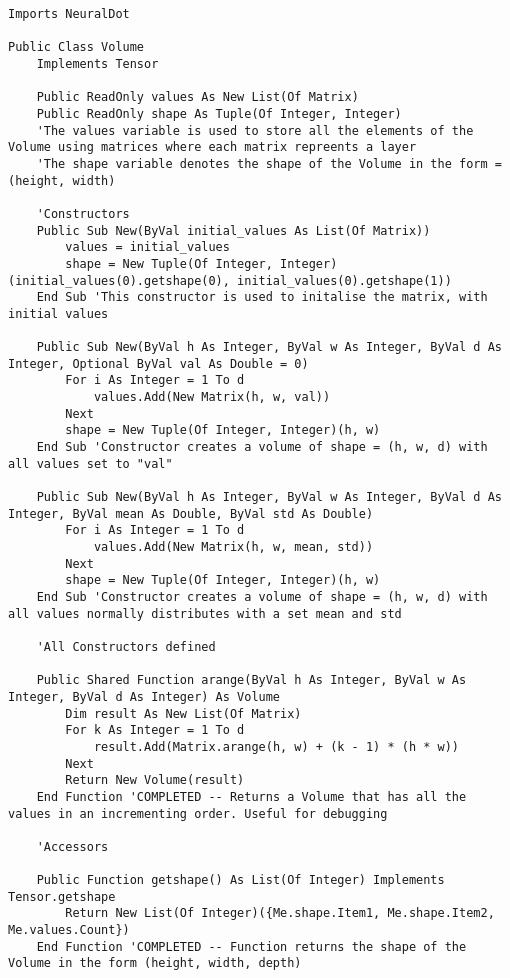 \begin{verbatim}
Imports NeuralDot

Public Class Volume
    Implements Tensor

    Public ReadOnly values As New List(Of Matrix)
    Public ReadOnly shape As Tuple(Of Integer, Integer)
    'The values variable is used to store all the elements of the Volume using matrices where each matrix repreents a layer
    'The shape variable denotes the shape of the Volume in the form = (height, width)

    'Constructors
    Public Sub New(ByVal initial_values As List(Of Matrix))
        values = initial_values
        shape = New Tuple(Of Integer, Integer)(initial_values(0).getshape(0), initial_values(0).getshape(1))
    End Sub 'This constructor is used to initalise the matrix, with initial values

    Public Sub New(ByVal h As Integer, ByVal w As Integer, ByVal d As Integer, Optional ByVal val As Double = 0)
        For i As Integer = 1 To d
            values.Add(New Matrix(h, w, val))
        Next
        shape = New Tuple(Of Integer, Integer)(h, w)
    End Sub 'Constructor creates a volume of shape = (h, w, d) with all values set to "val"

    Public Sub New(ByVal h As Integer, ByVal w As Integer, ByVal d As Integer, ByVal mean As Double, ByVal std As Double)
        For i As Integer = 1 To d
            values.Add(New Matrix(h, w, mean, std))
        Next
        shape = New Tuple(Of Integer, Integer)(h, w)
    End Sub 'Constructor creates a volume of shape = (h, w, d) with all values normally distributes with a set mean and std

    'All Constructors defined

    Public Shared Function arange(ByVal h As Integer, ByVal w As Integer, ByVal d As Integer) As Volume
        Dim result As New List(Of Matrix)
        For k As Integer = 1 To d
            result.Add(Matrix.arange(h, w) + (k - 1) * (h * w))
        Next
        Return New Volume(result)
    End Function 'COMPLETED -- Returns a Volume that has all the values in an incrementing order. Useful for debugging

    'Accessors

    Public Function getshape() As List(Of Integer) Implements Tensor.getshape
        Return New List(Of Integer)({Me.shape.Item1, Me.shape.Item2, Me.values.Count})
    End Function 'COMPLETED -- Function returns the shape of the Volume in the form (height, width, depth)


\end{verbatim}
